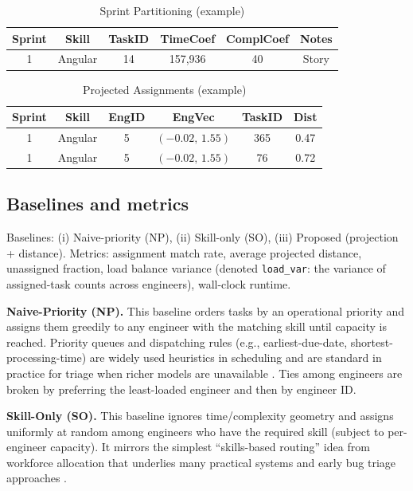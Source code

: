\documentclass[journal]{IEEEtran}
\begin{document}
\begin{table}[H]
    \centering
    \caption{Sprint Partitioning (example)}
    \label{tab:sprints}
    \begin{tabular}{cccccc}
    \toprule
    Sprint & Skill & TaskID & TimeCoef & ComplCoef & Notes \\
    \midrule
    1 & Angular & 14 & 157{,}936 & 40 & Story \\
    \bottomrule
    \end{tabular}
\end{table}

\begin{table}[H]
    \centering
    \caption{Projected Assignments (example)}
    \label{tab:assignments}
    \begin{tabular}{cccccc}
    \toprule
    Sprint & Skill & EngID & EngVec & TaskID & Dist \\
    \midrule
    1 & Angular & 5 & $(-0.02,\,1.55)$ & 365 & 0.47 \\
    1 & Angular & 5 & $(-0.02,\,1.55)$ & 76  & 0.72 \\
    \bottomrule
    \end{tabular}
\end{table}

\subsection{Baselines and metrics}
Baselines: (i) Naive-priority (NP), (ii) Skill-only (SO), (iii) Proposed (projection + distance). Metrics: assignment match rate, average projected distance, unassigned fraction, load balance variance (denoted \texttt{load\_var}: the variance of assigned-task counts across engineers), wall-clock runtime.

\noindent\textbf{Naive-Priority (NP).} This baseline orders tasks by an operational priority and assigns them greedily to any engineer with the matching skill until capacity is reached. Priority queues and dispatching rules (e.g., earliest-due-date, shortest-processing-time) are widely used heuristics in scheduling and are standard in practice for triage when richer models are unavailable \cite{karger_sched_notes}. Ties among engineers are broken by preferring the least-loaded engineer and then by engineer ID.

\noindent\textbf{Skill-Only (SO).} This baseline ignores time/complexity geometry and assigns uniformly at random among engineers who have the required skill (subject to per-engineer capacity). It mirrors the simplest “skills-based routing” idea from workforce allocation that underlies many practical systems and early bug triage approaches \cite{xuan2017bugtriage,guo2011notmybug}.
\end{document}
